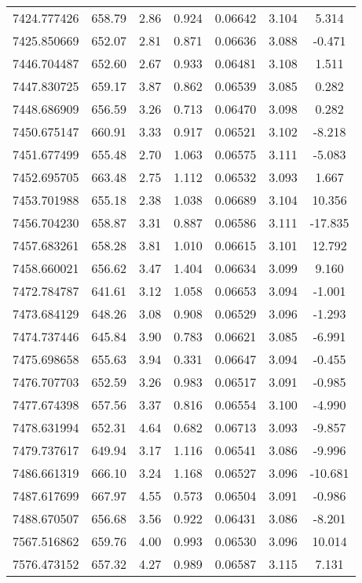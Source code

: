 \begin{table}
\begin{tabular}{ccccccc}
7424.777426 & 658.79 & 2.86 & 0.924 & 0.06642 & 3.104 & 5.314 \\
7425.850669 & 652.07 & 2.81 & 0.871 & 0.06636 & 3.088 & -0.471 \\
7446.704487 & 652.60 & 2.67 & 0.933 & 0.06481 & 3.108 & 1.511 \\
7447.830725 & 659.17 & 3.87 & 0.862 & 0.06539 & 3.085 & 0.282 \\
7448.686909 & 656.59 & 3.26 & 0.713 & 0.06470 & 3.098 & 0.282 \\
7450.675147 & 660.91 & 3.33 & 0.917 & 0.06521 & 3.102 & -8.218 \\
7451.677499 & 655.48 & 2.70 & 1.063 & 0.06575 & 3.111 & -5.083 \\
7452.695705 & 663.48 & 2.75 & 1.112 & 0.06532 & 3.093 & 1.667 \\
7453.701988 & 655.18 & 2.38 & 1.038 & 0.06689 & 3.104 & 10.356 \\
7456.704230 & 658.87 & 3.31 & 0.887 & 0.06586 & 3.111 & -17.835 \\
7457.683261 & 658.28 & 3.81 & 1.010 & 0.06615 & 3.101 & 12.792 \\
7458.660021 & 656.62 & 3.47 & 1.404 & 0.06634 & 3.099 & 9.160 \\
7472.784787 & 641.61 & 3.12 & 1.058 & 0.06653 & 3.094 & -1.001 \\
7473.684129 & 648.26 & 3.08 & 0.908 & 0.06529 & 3.096 & -1.293 \\
7474.737446 & 645.84 & 3.90 & 0.783 & 0.06621 & 3.085 & -6.991 \\
7475.698658 & 655.63 & 3.94 & 0.331 & 0.06647 & 3.094 & -0.455 \\
7476.707703 & 652.59 & 3.26 & 0.983 & 0.06517 & 3.091 & -0.985 \\
7477.674398 & 657.56 & 3.37 & 0.816 & 0.06554 & 3.100 & -4.990 \\
7478.631994 & 652.31 & 4.64 & 0.682 & 0.06713 & 3.093 & -9.857 \\
7479.737617 & 649.94 & 3.17 & 1.116 & 0.06541 & 3.086 & -9.996 \\
7486.661319 & 666.10 & 3.24 & 1.168 & 0.06527 & 3.096 & -10.681 \\
7487.617699 & 667.97 & 4.55 & 0.573 & 0.06504 & 3.091 & -0.986 \\
7488.670507 & 656.68 & 3.56 & 0.922 & 0.06431 & 3.086 & -8.201 \\
7567.516862 & 659.76 & 4.00 & 0.993 & 0.06530 & 3.096 & 10.014 \\
7576.473152 & 657.32 & 4.27 & 0.989 & 0.06587 & 3.115 & 7.131 \\

\end{tabular}
\end{table}
